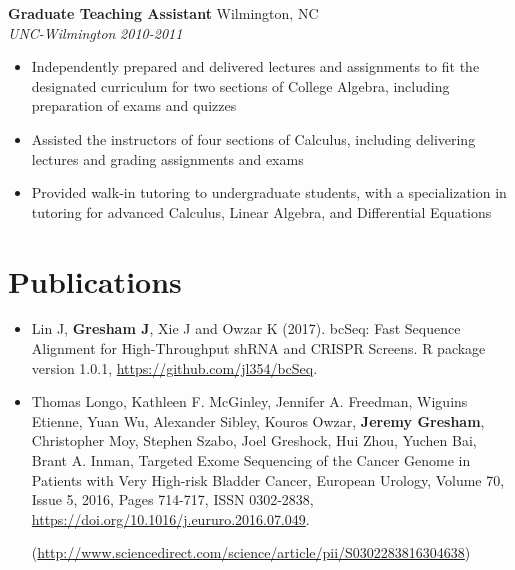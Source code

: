 \documentclass[10pt]{article}
\begin{document}
\noindent
{\bf Graduate Teaching Assistant} \hfill Wilmington, NC\\
{\it UNC-Wilmington} \hfill {\it 2010-2011}
  
\begin{itemize}\raggedright
  \setlength{\itemsep}{0pt}
  
\item Independently prepared and delivered lectures and assignments to fit the designated curriculum for two sections of College Algebra, including preparation of exams and quizzes

\item Assisted the instructors of four sections of Calculus, including delivering lectures and grading assignments and exams

\item Provided walk-in tutoring to undergraduate students, with a specialization in tutoring for advanced Calculus, Linear Algebra, and Differential Equations

\end{itemize}


\section*{Publications}
\begin{itemize}\raggedright
\setlength{\itemsep}{0pt}

  \item Lin J, {\bf Gresham J}, Xie J and Owzar K (2017). bcSeq: Fast Sequence
  Alignment for High-Throughput shRNA and CRISPR Screens. R package version
  1.0.1, \href{https://github.com/jl354/bcSeq}{https://github.com/jl354/bcSeq}.

  \item Thomas Longo, Kathleen F. McGinley, Jennifer A. Freedman,
  Wiguins Etienne, Yuan Wu, Alexander Sibley, Kouros Owzar, {\bf Jeremy Gresham},
  Christopher Moy, Stephen Szabo, Joel Greshock, Hui Zhou, Yuchen Bai,
  Brant A. Inman, Targeted Exome Sequencing of the Cancer Genome in Patients
  with Very High-risk Bladder Cancer, European Urology, Volume 70, Issue 5,
   2016, Pages 714-717, ISSN 0302-2838,
   \href{https://doi.org/10.1016/j.eururo.2016.07.049}{https://doi.org/10.1016/j.eururo.2016.07.049}.

   (\href{http://www.sciencedirect.com/science/article/pii/S0302283816304638}{http://www.sciencedirect.com/science/article/pii/S0302283816304638})


\end{itemize}
\end{document}
